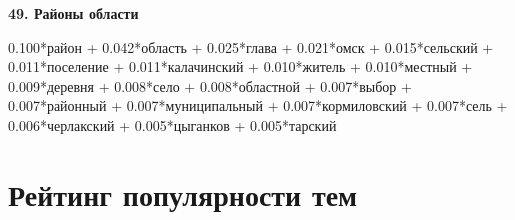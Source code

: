 \textbf{49. Районы области}

0.100*район + 0.042*область + 0.025*глава + 0.021*омск + 0.015*сельский + 0.011*поселение + 0.011*калачинский + 0.010*житель + 0.010*местный + 0.009*деревня + 0.008*село + 0.008*областной + 0.007*выбор + 0.007*районный + 0.007*муниципальный + 0.007*кормиловский + 0.007*сель + 0.006*черлакский + 0.005*цыганков + 0.005*тарский

\chapter{Рейтинг популярности тем} \label{app:popular_topics}
\begin{comment}
\begin{longtable}[c]{|l|c|c|}
	\caption{Самые популярные темы, рассчитанные через отнесение документа к одной наиболее вероятной теме}\label{table:popular_topics_1} 
	\\ 
	\hline
	Порядок & Номер темы. & Количество записей \\ \hline
	\endfirsthead   \hline
	\multicolumn{3}{|c|}{\small\slshape (продолжение)}        \\ \hline
	Порядок & Номер темы. & Количество записей \\ \hline
	\endhead        \hline
	\multicolumn{3}{|r|}{\small\slshape продолжение следует}  \\ \hline
	\endfoot        \hline
	\endlastfoot
		1 & 19 & 1855 \\
		2 & 43 & 1845 \\
		3 & 39 & 1609 \\
		4 & 4 & 1443 \\
		5 & 10 & 1398 \\
		6 & 1 & 1347 \\
		7 & 29 & 1324 \\
		8 & 32 & 1277 \\
		9 & 7 & 1230 \\
		10 & 16 & 1098 \\
		11 & 45 & 1081 \\
		12 & 2 & 955 \\
		13 & 11 & 949 \\
		14 & 0 & 810 \\
		15 & 6 & 809 \\
		16 & 15 & 789 \\
		17 & 41 & 782 \\
		18 & 12 & 752 \\

\end{comment}
